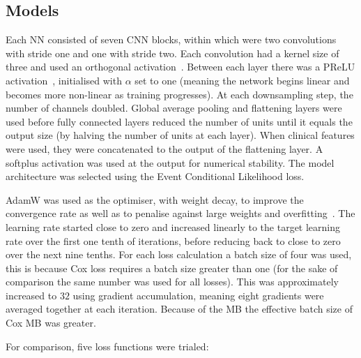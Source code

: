         \subsection{Models} \label{sec:deep_learning_for_ct_based_survival_analysis_of_idiopathic_pulmonary_fibrosis_patients_appendix_methods_models}
            Each \gls{NN} consisted of seven \gls{CNN} blocks, within which were two convolutions with stride one and one with stride two. Each convolution had a kernel size of three and used an orthogonal activation~\parencite{Hu2020ProvableNetworks}. Between each layer there was a \gls{PReLU} activation~\parencite{He2015DelvingClassification}, initialised with $\alpha$ set to one (meaning the network begins linear and becomes more non-linear as training progresses). At each downsampling step, the number of channels doubled. Global average pooling and flattening layers were used before fully connected layers reduced the number of units until it equals the output size (by halving the number of units at each layer). When clinical features were used, they were concatenated to the output of the flattening layer. A softplus activation was used at the output for numerical stability. The model architecture was selected using the Event Conditional Likelihood loss.
    
            AdamW was used as the optimiser, with weight decay, to improve the convergence rate as well as to penalise against large weights and overfitting~\parencite{Loshchilov2019DecoupledRegularization}. The learning rate started close to zero and increased linearly to the target learning rate over the first one tenth of iterations, before reducing back to close to zero over the next nine tenths. For each loss calculation a batch size of four was used, this is because Cox loss requires a batch size greater than one (for the sake of comparison the same number was used for all losses). This was approximately increased to $32$ using gradient accumulation, meaning eight gradients were averaged together at each iteration. Because of the \gls{MB} the effective batch size of Cox \gls{MB} was greater.
    
            For comparison, five loss functions were trialed:
    
